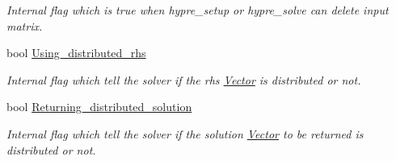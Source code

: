 \begin{DoxyCompactItemize}
\begin{DoxyCompactList}\small\item\em Internal flag which is true when hypre\+\_\+setup or hypre\+\_\+solve can delete input matrix. \end{DoxyCompactList}\item 
bool \hyperlink{classoomph_1_1HypreInterface_a3e1fd87d247b737001fb366bf4a7081f}{Using\+\_\+distributed\+\_\+rhs}
\begin{DoxyCompactList}\small\item\em Internal flag which tell the solver if the rhs \hyperlink{classoomph_1_1Vector}{Vector} is distributed or not. \end{DoxyCompactList}\item 
bool \hyperlink{classoomph_1_1HypreInterface_a1bc7fe7e11b5c08cc768969b9e1f8641}{Returning\+\_\+distributed\+\_\+solution}
\begin{DoxyCompactList}\small\item\em Internal flag which tell the solver if the solution \hyperlink{classoomph_1_1Vector}{Vector} to be returned is distributed or not. \end{DoxyCompactList}\end{DoxyCompactItemize}
